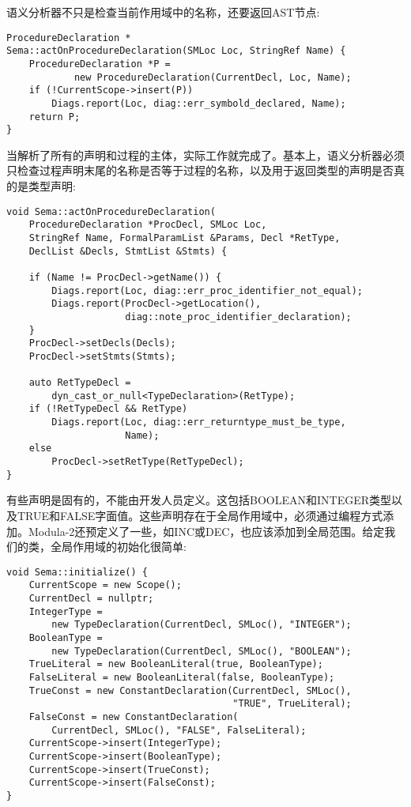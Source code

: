 语义分析器不只是检查当前作用域中的名称，还要返回AST节点:\par

\begin{lstlisting}[caption={}]
ProcedureDeclaration *
Sema::actOnProcedureDeclaration(SMLoc Loc, StringRef Name) {
	ProcedureDeclaration *P =
			new ProcedureDeclaration(CurrentDecl, Loc, Name);
	if (!CurrentScope->insert(P))
		Diags.report(Loc, diag::err_symbold_declared, Name);
	return P;
}
\end{lstlisting}

当解析了所有的声明和过程的主体，实际工作就完成了。基本上，语义分析器必须只检查过程声明末尾的名称是否等于过程的名称，以及用于返回类型的声明是否真的是类型声明:\par

\begin{lstlisting}[caption={}]
void Sema::actOnProcedureDeclaration(
	ProcedureDeclaration *ProcDecl, SMLoc Loc,
	StringRef Name, FormalParamList &Params, Decl *RetType,
	DeclList &Decls, StmtList &Stmts) {
		
	if (Name != ProcDecl->getName()) {
		Diags.report(Loc, diag::err_proc_identifier_not_equal);
		Diags.report(ProcDecl->getLocation(),
					 diag::note_proc_identifier_declaration);
	}
	ProcDecl->setDecls(Decls);
	ProcDecl->setStmts(Stmts);
	
	auto RetTypeDecl =
		dyn_cast_or_null<TypeDeclaration>(RetType);
	if (!RetTypeDecl && RetType)
		Diags.report(Loc, diag::err_returntype_must_be_type,
					 Name);
	else
		ProcDecl->setRetType(RetTypeDecl);
}
\end{lstlisting}

有些声明是固有的，不能由开发人员定义。这包括BOOLEAN和INTEGER类型以及TRUE和FALSE字面值。这些声明存在于全局作用域中，必须通过编程方式添加。Modula-2还预定义了一些，如INC或DEC，也应该添加到全局范围。给定我们的类，全局作用域的初始化很简单:\par

\begin{lstlisting}[caption={}]
void Sema::initialize() {
	CurrentScope = new Scope();
	CurrentDecl = nullptr;
	IntegerType =
		new TypeDeclaration(CurrentDecl, SMLoc(), "INTEGER");
	BooleanType =
		new TypeDeclaration(CurrentDecl, SMLoc(), "BOOLEAN");
	TrueLiteral = new BooleanLiteral(true, BooleanType);
	FalseLiteral = new BooleanLiteral(false, BooleanType);
	TrueConst = new ConstantDeclaration(CurrentDecl, SMLoc(),
										"TRUE", TrueLiteral);
	FalseConst = new ConstantDeclaration(
		CurrentDecl, SMLoc(), "FALSE", FalseLiteral);
	CurrentScope->insert(IntegerType);
	CurrentScope->insert(BooleanType);
	CurrentScope->insert(TrueConst);
	CurrentScope->insert(FalseConst);
}
\end{lstlisting}

